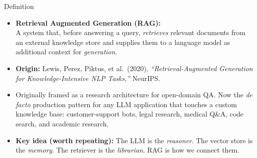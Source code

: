\begin{frame}{Definition}
\begin{itemize}
\item \textbf{Retrieval Augmented Generation (RAG):}\\
A system that, before answering a query, \emph{retrieves} relevant documents from an external knowledge store and supplies them to a language model as additional context for \emph{generation}.

\medskip
\item \textbf{Origin:} Lewis, Perez, Piktus, et al.\ (2020), \emph{``Retrieval-Augmented Generation for Knowledge-Intensive NLP Tasks,''} NeurIPS.

\medskip
\item Originally framed as a research architecture for open-domain QA. Now the \emph{de facto} production pattern for any LLM application that touches a custom knowledge base: customer-support bots, legal research, medical Q\&A, code search, and academic research.

\medskip
\item \textbf{Key idea (worth repeating):} The LLM is the \emph{reasoner}. The vector store is the \emph{memory}. The retriever is the \emph{librarian}. RAG is how we connect them.
\end{itemize}
\end{frame}

